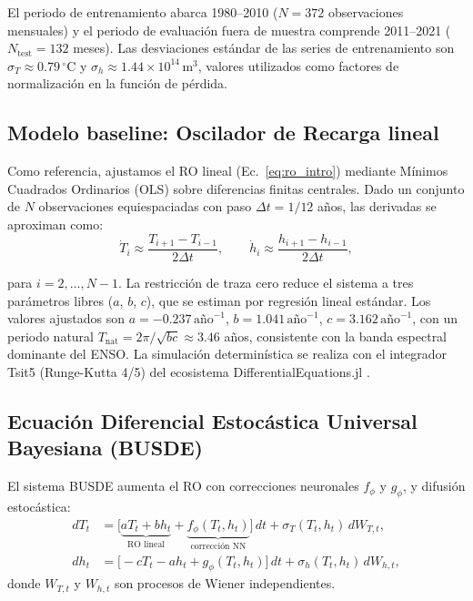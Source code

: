 \documentclass[11pt,a4paper]{article}
\newcommand{\Dt}{\Delta t}
\begin{document}
El periodo de entrenamiento abarca 1980--2010 ($N = 372$ observaciones mensuales) y el periodo de evaluación fuera de muestra comprende 2011--2021 ($N_{\text{test}} = 132$ meses). Las desviaciones estándar de las series de entrenamiento son $\sigma_T \approx 0.79\,^{\circ}\mathrm{C}$ y $\sigma_h \approx 1.44 \times 10^{14}\,\mathrm{m}^3$, valores utilizados como factores de normalización en la función de pérdida.

\subsection{Modelo baseline: Oscilador de Recarga lineal}
\label{sec:baseline}

Como referencia, ajustamos el RO lineal (Ec.~\ref{eq:ro_intro}) mediante Mínimos Cuadrados Ordinarios (OLS) sobre diferencias finitas centrales. Dado un conjunto de $N$ observaciones equiespaciadas con paso $\Dt = 1/12$ años, las derivadas se aproximan como:
\begin{equation}
\dot{T}_i \approx \frac{T_{i+1} - T_{i-1}}{2\Dt}, \qquad
\dot{h}_i \approx \frac{h_{i+1} - h_{i-1}}{2\Dt},
\end{equation}

para $i = 2, \ldots, N-1$. La restricción de traza cero reduce el sistema a tres parámetros libres ($a$, $b$, $c$), que se estiman por regresión lineal estándar. Los valores ajustados son $a = -0.237\,\text{año}^{-1}$, $b = 1.041\,\text{año}^{-1}$, $c = 3.162\,\text{año}^{-1}$, con un periodo natural $T_{\text{nat}} = 2\pi/\sqrt{bc} \approx 3.46$ años, consistente con la banda espectral dominante del ENSO. La simulación determinística se realiza con el integrador Tsit5 (Runge-Kutta 4/5) del ecosistema DifferentialEquations.jl \citep{rackauckas2017}.

\subsection{Ecuación Diferencial Estocástica Universal Bayesiana (BUSDE)}
\label{sec:busde}

El sistema BUSDE aumenta el RO con correcciones neuronales $f_\phi$ y $g_\phi$, y difusión estocástica:
\begin{align}
dT_t &= \Big[\underbrace{aT_t + bh_t}_{\text{RO lineal}} + \underbrace{f_\phi(T_t, h_t)}_{\text{corrección NN}}\Big]\,dt + \sigma_T(T_t, h_t)\,dW_{T,t}, \label{eq:busde_T} \\
dh_t &= \Big[-cT_t - ah_t + g_\phi(T_t, h_t) \Big]\,dt + \sigma_h(T_t, h_t)\,dW_{h,t}, \label{eq:busde_h}
\end{align}
donde $W_{T,t}$ y $W_{h,t}$ son procesos de Wiener independientes.
\end{document}
